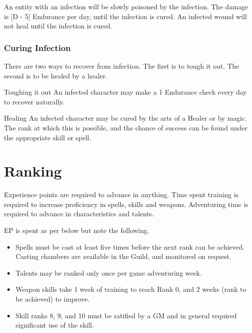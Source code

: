\begin{multicols*}{3}
An entity with an infection will be slowly poisoned by the
infection. The damage is [D - 5] Endurance per day, until the infection
is cured. An infected wound will not heal until the infection is
cured.

\subsubsection{Curing Infection}

There are two ways to recover from infection. The first is to tough it
out. The second is to be healed by a healer.

\begin{Description}
\item[Toughing it out] An infected character may make a 1 \x Endurance
check every day to recover naturally.

\item[Healing] An infected character may be cured by the arts of a
Healer or by magic. The rank at which this is possible, and the chance
of success can be found under the appropriate skill or spell.
\end{Description}

\section{Ranking}
\label{adventure:ranking}

Experience points are required to advance in anything.  Time spent
training is required to increase proficiency in spells, skills and
weapons.  Adventuring time is required to advance in characteristics
and talents.

EP is spent as per below but note the following.
\begin{itemize}

\item
Spells must be cast at least five times before the next rank can be
achieved.  Casting chambers are available in the Guild, and monitored
on request.

\item
Talents may be ranked only once per game adventuring week.

\item
Weapon skills take 1 week of training to reach Rank 0, and 2 weeks \x
(rank to be achieved) to improve.

\item
Skill ranks 8, 9, and 10 must be ratified by a GM and in general
required significant use of the skill.


\end{itemize}
\end{multicols*}
